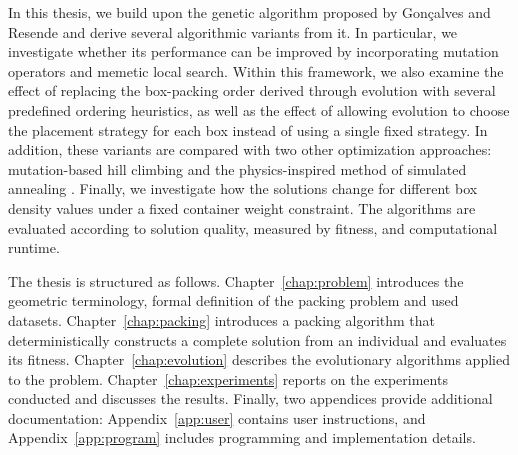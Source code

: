 In this thesis, we build upon the genetic algorithm proposed by Gonçalves and Resende \cite{goncalves2013} and derive several 
algorithmic variants from it. In particular, we investigate whether its performance can be improved by 
incorporating mutation operators and memetic local search. Within this framework, 
we also examine the effect of replacing the box-packing order derived through evolution with several 
predefined ordering heuristics, as well as the effect of allowing evolution to choose the placement strategy 
for each box instead of using a single fixed strategy. In addition, these variants are compared with two other 
optimization approaches: mutation-based hill climbing and the physics-inspired method of simulated annealing \cite{eiben2016}. 
Finally, we investigate how the solutions change for different box density values under a fixed container weight constraint. 
The algorithms are evaluated according to solution quality, measured by fitness, and computational runtime.

The thesis is structured as follows. 
Chapter~\ref{chap:problem} introduces the geometric terminology, formal definition of the packing problem and used datasets. 
Chapter~\ref{chap:packing} introduces a packing algorithm that deterministically constructs a complete solution from an individual and evaluates its fitness.
Chapter~\ref{chap:evolution} describes the evolutionary algorithms applied to the problem. 
Chapter~\ref{chap:experiments} reports on the experiments conducted and discusses the results. 
Finally, two appendices provide additional documentation: 
Appendix~\ref{app:user} contains user instructions, and Appendix~\ref{app:program} includes programming and implementation details.
